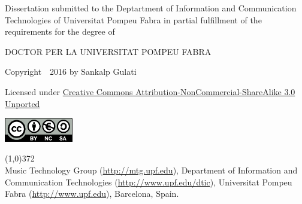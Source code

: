\cleartorecto
\thispagestyle{empty}

\vspace*{02cm}

Dissertation submitted to the Deptartment of Information and Communication Technologies of Universitat Pompeu Fabra in partial fulfillment of the requirements for the degree of

\vspace*{0.5cm}

\centerline{DOCTOR PER LA UNIVERSITAT POMPEU FABRA}


\vspace*{4cm}


{\centering 
	{\footnotesize Copyright~\textcopyright~2016 by Sankalp Gulati}

	Licensed under \href{http://creativecommons.org/licenses/by-nc-sa/3.0/}{Creative Commons Attribution-NonCommercial-ShareAlike 3.0 Unported}
	
	\href{http://creativecommons.org/licenses/by-nc-sa/3.0/}
	{
		\centering
		\includegraphics[width=3cm]{ch00/figures/creative-commons2.png}
		}

}

\vspace*{\fill}

\line(1,0){372}\\
\footnotesize
Music Technology Group (\url{http://mtg.upf.edu}), Department of Information and Communication Technologies (\url{http://www.upf.edu/dtic}), Universitat Pompeu Fabra (\url{http://www.upf.edu}), Barcelona, Spain.
\normalsize



